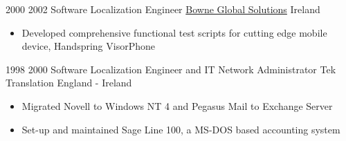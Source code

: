 \vspace{0.75\baselineskip}%

\begin{twenty}
\twentyitem
  {2000}
  {2002}
    {Software Localization Engineer}
    {\href{https://www.lionbridge.com/}{Bowne Global Solutions}}
    {Ireland}
    {}
    {}
    {\begin{itemize}
    \item Developed comprehensive functional test scripts for cutting edge mobile device, Handspring VisorPhone
    \end{itemize}
    }
\end{twenty}

\vspace{0.75\baselineskip}%

\begin{twenty}
\twentyitem
  {1998}
  {2000}
    {Software Localization Engineer and IT Network Administrator}
    {Tek Translation}
    {England - Ireland}
    {}
    {}
    {\begin{itemize}
    \item Migrated Novell to Windows NT 4 and Pegasus Mail to Exchange Server
    \item Set-up and maintained Sage Line 100, a MS-DOS based accounting system
    \end{itemize}
    }
\end{twenty}
